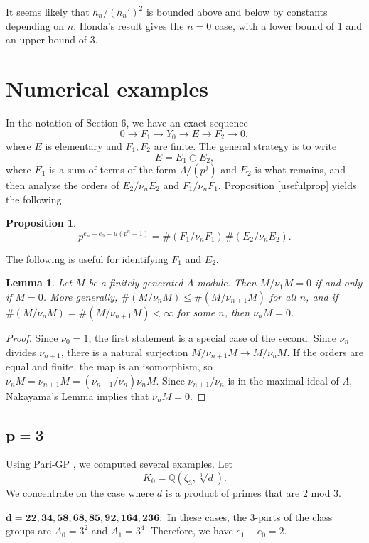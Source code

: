 \documentclass{amsart}
\newtheorem{proposition}[theorem]{Proposition}
\newtheorem{lemma}[theorem]{Lemma}
\begin{document}
It seems likely that $h_n/(h_n')^2$ is bounded above and below by constants depending on $n$. Honda's result
gives the $n=0$ case, with a lower bound of 1 and an upper bound of 3.



\section{Numerical examples}\label{SectComp}

In the notation of Section 6, we have an exact sequence
$$
0\to F_1\to Y_0 \to E \to F_2\to 0,
$$
where $E$ is elementary and $F_1, F_2$ are finite.
The general strategy is to write 
$$E =E_1\oplus E_2,
$$
where $E_1$ is a sum of terms of the form $\Lambda/(p^j)$ and $E_2$ is what remains,
and then analyze the orders of $E_2/\nu_nE_2$ and $F_1/\nu_nF_1$. 
Proposition \ref{usefulprop} yields the following.
\begin{proposition}\label{ene0}
$$
p^{e_n-e_0-\mu(p^n-1)} = \#(F_1/\nu_n F_1)\, \#(E_2/\nu_n E_2).
$$
\end{proposition}


The following is useful for identifying $F_1$ and $E_2$.
\begin{lemma}\label{LemmaNonDec} Let $M$ be a finitely generated $\Lambda$-module. Then
$ M/\nu_1 M = 0$ if and only if $M=0$. More generally,
$\#(M/\nu_n M) \le \#(M/\nu_{n+1}M)$ for all $n$, and 
if $\#(M/\nu_n M) = \#(M/\nu_{n+1}M)<\infty$  for some $n$, then $\nu_nM=0$.
\end{lemma}
\begin{proof}  Since $\nu_0=1$, the first statement is a special case of the second. Since $\nu_n$ divides $\nu_{n+1}$, 
there is a natural surjection $M/\nu_{n+1}M\to M/\nu_n M$.
If the orders are equal and finite, the map is an isomorphism, so $\nu_{n}M=\nu_{n+1}M= (\nu_{n+1}/\nu_n)\nu_nM$. 
 Since $\nu_{n+1}/\nu_n$ is in the maximal ideal of $\Lambda$, Nakayama's Lemma implies that $\nu_nM=0$. 
\end{proof}

\subsection{$\mathbf{p=3}$}

Using Pari-GP \cite{Pari}, we computed several examples. Let 
$$K_0=\mathbb Q(\zeta_3, \sqrt[3]{d}).
$$
We concentrate on the case
where $d$ is a product of primes that are 2 mod 3.
\medskip

\noindent
{$\mathbf{d= 22, 34, 58, 68, 85, 92, 164, 236:}$}
In these cases, the 3-parts of the class groups are $A_0=3^2$ and $A_1=3^4$. 
Therefore, we have $e_1-e_0=2$.
\end{document}
